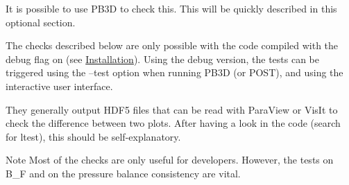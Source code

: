 It is possible to use P\+B3D to check this. This will be quickly described in this optional section.

The checks described below are only possible with the code compiled with the debug flag on (see \hyperlink{page_installation}{Installation}). Using the debug version, the tests can be triggered using the {\ttfamily --test} option when running P\+B3D (or P\+O\+ST), and using the interactive user interface.

They generally output H\+D\+F5 files that can be read with Para\+View or Vis\+It to check the difference between two plots. After having a look in the code (search for {\ttfamily ltest}), this should be self-\/explanatory.

\begin{DoxyNote}{Note}
Most of the checks are only useful for developers. However, the tests on {\ttfamily B\+\_\+F} and on the pressure balance consistency are vital.
\end{DoxyNote}
\hypertarget{page_tutorial_tutorial_test_eq_tab}{}
\tabulinesep=1mm
